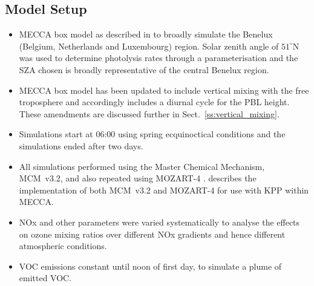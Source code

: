 \subsection{Model Setup} \label{ss:model_setup}
\begin{itemize}
    \item MECCA box model as described in \citet{Coates:2015} to broadly simulate the Benelux (Belgium, Netherlands and Luxembourg) region. Solar zenith angle of $51^{\circ}$N was used to determine photolysis rates through a parameterisation and the SZA chosen is broadly representative of the central Benelux region.
    \item MECCA box model has been updated to include vertical mixing with the free troposphere and accordingly includes a diurnal cycle for the PBL height. These amendments are discussed further in Sect.~\ref{ss:vertical_mixing}.
    \item Simulations start at 06:00 using spring ecquinoctical conditions and the simulations ended after two days.
    \item All simulations performed using the Master Chemical Mechanism, MCM~v3.2, \citep{MCM_Site} and also repeated using MOZART-4 \citep{Emmons:2010}. \citet{Coates:2015} describes the implementation of both MCM~v3.2 and MOZART-4 for use with KPP within MECCA.
    \item NOx and other parameters were varied systematically to analyse the effects on ozone mixing ratios over different NOx gradients and hence different atmospheric conditions.
    \item VOC emissions constant until noon of first day, to simulate a plume of emitted VOC.
\end{itemize}

